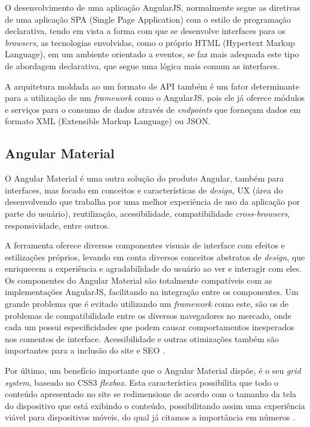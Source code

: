 O desenvolvimento de uma aplicação AngularJS, normalmente segue as diretivas de uma aplicação SPA (Single Page Application) com o estilo de programação declarativa, tendo em vista a forma com que se desenvolve interfaces para os \textit{browsers}, as tecnologias envolvidas, como o próprio HTML (Hypertext Markup Language), em um ambiente orientado a eventos, se faz mais adequada este tipo de abordagem declarativa, que segue uma lógica mais comum as interfaces.

A arquitetura moldada ao um formato de API também é um fator determinante para a utilização de um \textit{framework} como o AngularJS, pois ele já oferece módulos e serviços para o consumo de dados através de \textit{endpoints} que forneçam dados em formato XML (Extensible Markup Language) ou JSON.

\subsection{Angular Material}
O Angular Material \cite{angular-material} é uma outra solução do produto Angular, também para interfaces, mas focado em conceitos e características de \textit{design}, UX (área do desenvolvendo que trabalha por uma melhor experiência de uso da aplicação por parte do usuário), reutilização, acessibilidade, compatibilidade \textit{cross-browsers}, responsividade, entre outros. 

A ferramenta oferece diversos componentes visuais de interface com efeitos e estilizações próprios, levando em conta diversos conceitos abstratos de \textit{design}, que enriquecem a experiência e agradabilidade do usuário ao ver e interagir com eles. Os componentes do Angular Material são totalmente compatíveis com as implementações AngularJS, facilitando na integração entre os componentes. Um grande problema que é evitado utilizando um \textit{framework} como este, são os de problemas de compatibilidade entre os diversos navegadores no mercado, onde cada um possui especificidades que podem causar comportamentos inesperados nos comentos de interface. Acessibilidade e outras otimizações também são importantes para a inclusão do site e SEO \cite{seo}.

Por último, um benefício importante que o Angular Material dispõe, é o seu \textit{grid system}, baseado no CSS3 \textit{flexbox}. Esta característica possibilita que todo o conteúdo apresentado no site se redimensione de acordo com o tamanho da tela do dispositivo que está exibindo o conteúdo, possibilitando assim uma experiência viável para dispositivos móveis, do qual já citamos a importância em números \cite{internet-traffic-stats1} \cite{internet-traffic-stats2} \cite{internet-traffic-stats3}.  

